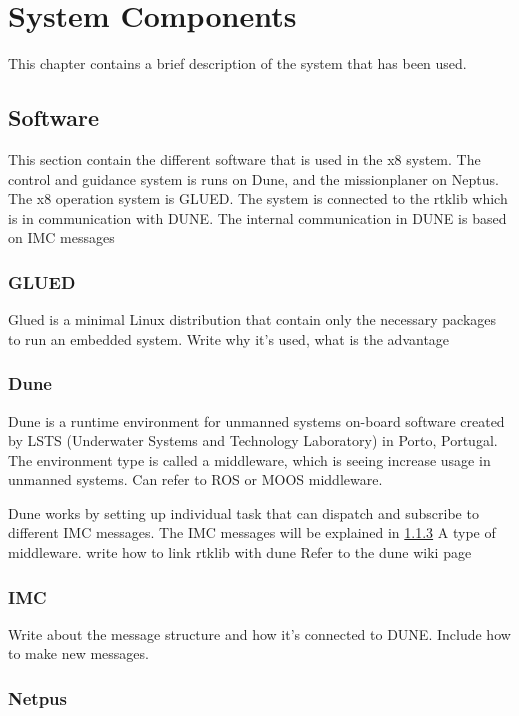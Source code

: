 
\chapter{System Components}
This chapter contains a brief description of the system that has been used.
\section{Software}
This section contain the different software that is used in the x8 system. The control and guidance system is runs on Dune, and the missionplaner on Neptus. The x8 operation system is GLUED. The system is connected to the rtklib which is in communication with DUNE. The internal communication in DUNE is based on IMC messages
\subsection{GLUED}
Glued is a minimal Linux distribution that contain only the necessary packages to run an embedded system. Write why it's used, what is the advantage
\subsection{Dune}
Dune is a runtime environment for unmanned systems on-board software created by LSTS (Underwater Systems and Technology Laboratory) in Porto, Portugal. The environment type is called a middleware, which is seeing increase usage in unmanned systems. Can refer to ROS or MOOS middleware.

Dune works by setting up individual task that can dispatch and subscribe to different IMC messages. The IMC messages will be explained in \ref{ss:IMC}
A type of middleware. write how to link rtklib with dune
Refer to the dune wiki page
\subsection{IMC}\label{ss:IMC}
Write about the message structure and how it's connected to DUNE. Include how to make new messages.
\subsection{Netpus}

